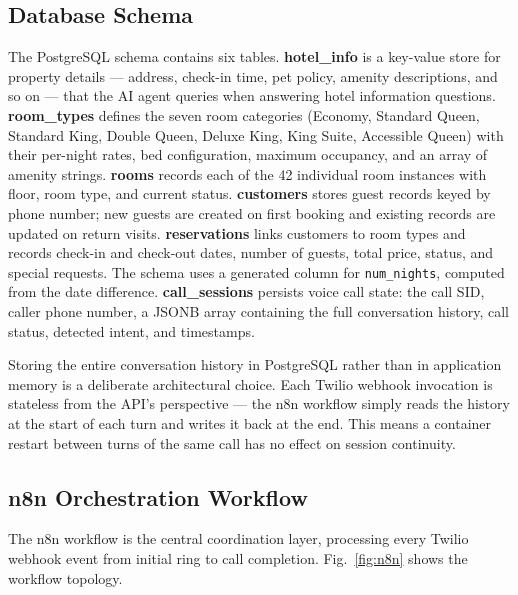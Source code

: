 \documentclass[conference]{IEEEtran}
\begin{document}
\subsection{Database Schema}

The PostgreSQL schema contains six tables. \textbf{hotel\_info} is a key-value
store for property details — address, check-in time, pet policy, amenity
descriptions, and so on — that the AI agent queries when answering hotel
information questions. \textbf{room\_types} defines the seven room categories
(Economy, Standard Queen, Standard King, Double Queen, Deluxe King, King Suite,
Accessible Queen) with their per-night rates, bed configuration, maximum
occupancy, and an array of amenity strings. \textbf{rooms} records each of the
42 individual room instances with floor, room type, and current status.
\textbf{customers} stores guest records keyed by phone number; new guests are
created on first booking and existing records are updated on return visits.
\textbf{reservations} links customers to room types and records check-in and
check-out dates, number of guests, total price, status, and special requests.
The schema uses a generated column for \texttt{num\_nights}, computed from the
date difference. \textbf{call\_sessions} persists voice call state: the call
SID, caller phone number, a JSONB array containing the full conversation
history, call status, detected intent, and timestamps.

Storing the entire conversation history in PostgreSQL rather than in application
memory is a deliberate architectural choice. Each Twilio webhook invocation is
stateless from the API's perspective — the n8n workflow simply reads the history
at the start of each turn and writes it back at the end. This means a container
restart between turns of the same call has no effect on session continuity.

\subsection{n8n Orchestration Workflow}

The n8n workflow is the central coordination layer, processing every Twilio
webhook event from initial ring to call completion. Fig.~\ref{fig:n8n} shows
the workflow topology.
\end{document}
